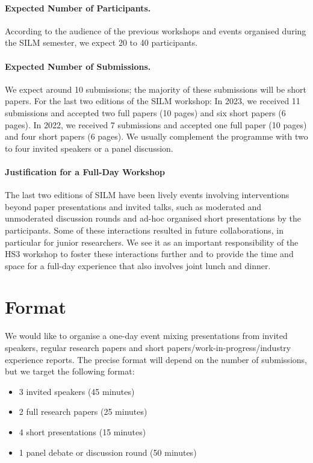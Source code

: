 \documentclass[a4paper,11pt]{article}
\begin{document}
\paragraph{Expected Number of Participants.}
%
According to the audience of the previous workshops and events organised
during the SILM semester, we expect 20 to 40 participants.

\paragraph{Expected Number of Submissions.}
%
We expect around 10 submissions; the majority of these submissions will be
short papers.
%
For the last two editions of the SILM workshop: 
In 2023, we received 11 submissions
and accepted two full papers (10 pages) and six short papers (6 pages).
In 2022, we received 7 submissions
and accepted one full paper (10 pages) and four short papers (6 pages).
We usually complement the programme with two to
four invited speakers or a panel discussion.

\paragraph{Justification for a Full-Day Workshop}
%
The last two editions of SILM have been lively events involving
interventions beyond paper presentations and invited talks, such as moderated
and unmoderated discussion rounds and ad-hoc organised short presentations
by the participants. Some of these interactions resulted in future
collaborations, in particular for junior researchers. We see it as an important responsibility of the HS3 workshop to foster these
interactions further and to provide the time and space for a full-day experience
that also involves joint lunch and dinner.


\section{Format}
%
We would like to organise a one-day event mixing presentations from invited
speakers, regular research papers and short papers/work-in-progress/industry experience reports. The precise format
will depend on the number of submissions, but we target the following
format:
%
\begin{itemize}
    \item 3 invited speakers (45 minutes)
    \item 2 full research papers (25 minutes)
    \item 4 short presentations (15 minutes)
    \item 1 panel debate or discussion round (50 minutes)
\end{itemize}
\end{document}
